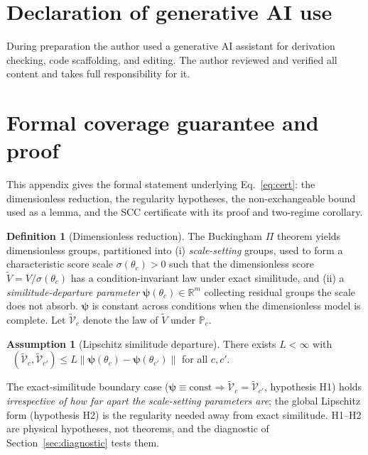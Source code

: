 \documentclass[review,times]{elsarticle}
\theoremstyle{definition}
\newtheorem{definition}{Definition}
\newtheorem{assumption}{Assumption}
\theoremstyle{remark}
\DeclareMathOperator{\dtv}{d_{\mathrm{TV}}}
\newcommand{\lawt}[1]{\tilde{\mathcal{V}}_{#1}}
\begin{document}
\section*{Declaration of generative AI use}
During preparation the author used a generative AI assistant for derivation checking, code
scaffolding, and editing. The author reviewed and verified all content and takes full
responsibility for it.


\appendix
\setcounter{table}{0}\setcounter{figure}{0}
\renewcommand{\thetable}{\Alph{section}.\arabic{table}}
\renewcommand{\thefigure}{\Alph{section}.\arabic{figure}}
\section{Formal coverage guarantee and proof}\label{app:proof}
This appendix gives the formal statement underlying Eq.~\eqref{eq:cert}: the dimensionless reduction,
the regularity hypotheses, the non-exchangeable bound used as a lemma, and the SCC certificate with
its proof and two-regime corollary.

\begin{definition}[Dimensionless reduction]\label{def:pi}
The Buckingham $\Pi$ theorem yields dimensionless groups, partitioned into (i) \emph{scale-setting}
groups, used to form a characteristic score scale $\sigma(\theta_c)>0$ such that the dimensionless
score $\tilde V=V/\sigma(\theta_c)$ has a condition-invariant law under exact similitude, and (ii) a
\emph{similitude-departure parameter} $\boldsymbol\psi(\theta_c)\in\mathbb R^m$ collecting residual
groups the scale does not absorb. $\boldsymbol\psi$ is constant across conditions when the
dimensionless model is complete. Let $\lawt c$ denote the law of $\tilde V$ under $\mathbb P_c$.
\end{definition}

\begin{assumption}[Lipschitz similitude departure]\label{ass:lip}
There exists $L<\infty$ with
$\dtv(\lawt c,\lawt{c'})\le L\lVert\boldsymbol\psi(\theta_c)-\boldsymbol\psi(\theta_{c'})\rVert$ for
all $c,c'$.
\end{assumption}
The exact-similitude boundary case
($\boldsymbol\psi\equiv\mathrm{const}\Rightarrow\lawt c=\lawt{c'}$, hypothesis H1) holds
\emph{irrespective of how far apart the scale-setting parameters are}; the global Lipschitz form
(hypothesis H2) is the regularity needed away from exact similitude. H1--H2 are physical hypotheses,
not theorems, and the diagnostic of Section~\ref{sec:diagnostic} tests them.
\end{document}
